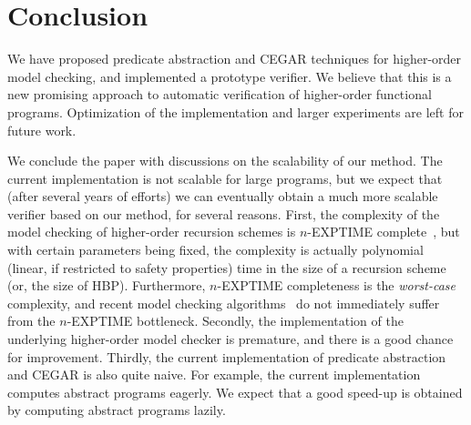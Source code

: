 \section{Conclusion}
\label{sec:conc}

We have proposed predicate abstraction and CEGAR techniques for higher-order model checking,
and implemented a prototype verifier. We believe that this is a new promising approach to
automatic verification of higher-order functional programs.
Optimization of the implementation and larger experiments are left for future work.

We conclude the paper with discussions on the scalability of our method.
The current implementation is not scalable for large programs, but
we expect that (after several years of efforts) we can eventually obtain 
a much more scalable verifier based on our method, for several reasons. 
First, the complexity of the model checking of higher-order recursion 
schemes is \(n\)-EXPTIME complete~\cite{Ong2006}, but with certain 
parameters being fixed, the complexity is actually polynomial (linear, 
if restricted to safety properties) time in the size of a recursion 
scheme (or, the size of HBP). Furthermore, \(n\)-EXPTIME completeness is 
the \emph{worst-case} complexity, and recent model checking 
algorithms~\cite{Kobayashi2009c,Kobayashi2011a} do not immediately 
suffer from the \(n\)-EXPTIME bottleneck. Secondly, the implementation 
of the underlying higher-order model checker \trecs{} is premature, 
and there is a good chance for improvement. Thirdly, the current 
implementation of predicate abstraction and CEGAR is also quite naive. 
For example, the current implementation computes abstract programs 
eagerly. We expect that a good speed-up is obtained by computing 
abstract programs lazily.
